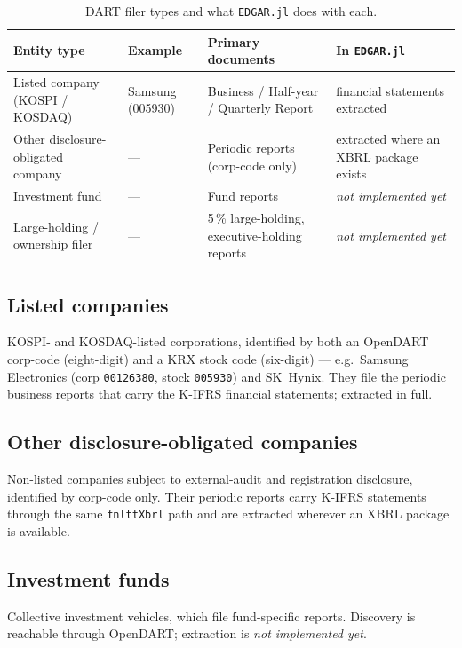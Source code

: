 \documentclass[11pt,a4paper]{report}
\begin{document}
\begin{table}[h]
\centering
\small
\caption{DART filer types and what \texttt{EDGAR.jl} does with each.}
\label{tab:dart-entities}
\begin{tabular}{@{}p{}p{}p{}p{}@{}}
\toprule
\textbf{Entity type} & \textbf{Example} & \textbf{Primary documents} & \textbf{In \texttt{EDGAR.jl}} \\
\midrule
Listed company (KOSPI / KOSDAQ) & Samsung (005930) & Business / Half-year / Quarterly Report & financial statements extracted \\
Other disclosure-obligated company & --- & Periodic reports (corp-code only) & extracted where an XBRL package exists \\
Investment fund & --- & Fund reports & \emph{not implemented yet} \\
Large-holding / ownership filer & --- & 5\,\% large-holding, executive-holding reports & \emph{not implemented yet} \\
\bottomrule
\end{tabular}
\end{table}

\subsection{Listed companies}
KOSPI- and KOSDAQ-listed corporations, identified by both an OpenDART corp-code (eight-digit) and a KRX
stock code (six-digit) --- e.g.\ Samsung Electronics (corp \texttt{00126380}, stock \texttt{005930}) and
SK~Hynix. They file the periodic business reports that carry the K-IFRS financial statements; extracted in
full.

\subsection{Other disclosure-obligated companies}
Non-listed companies subject to external-audit and registration disclosure, identified by corp-code only.
Their periodic reports carry K-IFRS statements through the same \texttt{fnlttXbrl} path and are extracted
wherever an XBRL package is available.

\subsection{Investment funds}
Collective investment vehicles, which file fund-specific reports. Discovery is reachable through OpenDART;
extraction is \emph{not implemented yet}.
\end{document}
